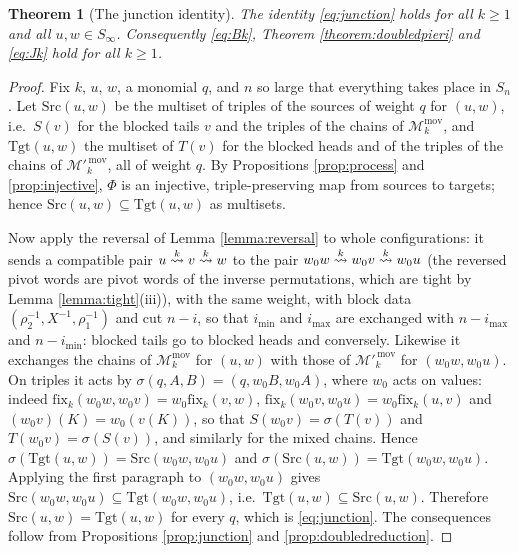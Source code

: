 \documentclass{amsart}
\newtheorem{theorem}[lemma]{Theorem}
\theoremstyle{definition}
\theoremstyle{remark}
\numberwithin{equation}{section}
\newcommand{\xrightsquigarrow}[2][]{%
	\mathrel{\mathop{\rightsquigarrow}\limits^{\scriptstyle #2}%
	\ifx\hfuzz#1\hfuzz\else_{\scriptstyle #1}\fi}%
}
\newcommand{\tom}[1]{\ensuremath{\xrightsquigarrow{#1}}}
\newcommand{\fx}{\mathrm{fix}}
\begin{document}
\begin{theorem}[The junction identity] \label{theorem:junction}
The identity \eqref{eq:junction} holds for all $k\geq1$ and all $u,w\in S_\infty$. Consequently \eqref{eq:Bk}, Theorem \ref{theorem:doubledpieri} and \eqref{eq:Jk} hold for all $k\geq1$.
\end{theorem}
\begin{proof}
Fix $k$, $u$, $w$, a monomial $q$, and $n$ so large that everything takes place in $S_n$. Let $\mathrm{Src}(u,w)$ be the multiset of triples of the sources of weight $q$ for $(u,w)$, i.e.\ $S(v)$ for the blocked tails $v$ and the triples of the chains of $\mathcal M_k^{\mathrm{mov}}$, and $\mathrm{Tgt}(u,w)$ the multiset of $T(v)$ for the blocked heads and of the triples of the chains of $\mathcal M'^{\,\mathrm{mov}}_k$, all of weight $q$. By Propositions \ref{prop:process} and \ref{prop:injective}, $\Phi$ is an injective, triple-preserving map from sources to targets; hence $\mathrm{Src}(u,w)\subseteq\mathrm{Tgt}(u,w)$ as multisets.

Now apply the reversal of Lemma \ref{lemma:reversal} to whole configurations: it sends a compatible pair $u\tom{k}v\tom{k}w$ to the pair $w_0w\tom{k}w_0v\tom{k}w_0u$ (the reversed pivot words are pivot words of the inverse permutations, which are tight by Lemma \ref{lemma:tight}(iii)), with the same weight, with block data $(\rho_2^{-1},X^{-1},\rho_1^{-1})$ and cut $n-i$, so that $i_{\min}$ and $i_{\max}$ are exchanged with $n-i_{\max}$ and $n-i_{\min}$: blocked tails go to blocked heads and conversely. Likewise it exchanges the chains of $\mathcal M_k^{\mathrm{mov}}$ for $(u,w)$ with those of $\mathcal M'^{\,\mathrm{mov}}_k$ for $(w_0w,w_0u)$. On triples it acts by $\sigma(q,A,B)=(q,w_0B,w_0A)$, where $w_0$ acts on values: indeed $\fx_k(w_0w,w_0v)=w_0\fx_k(v,w)$, $\fx_k(w_0v,w_0u)=w_0\fx_k(u,v)$ and $(w_0v)(K)=w_0(v(K))$, so that $S(w_0v)=\sigma(T(v))$ and $T(w_0v)=\sigma(S(v))$, and similarly for the mixed chains. Hence $\sigma(\mathrm{Tgt}(u,w))=\mathrm{Src}(w_0w,w_0u)$ and $\sigma(\mathrm{Src}(u,w))=\mathrm{Tgt}(w_0w,w_0u)$. Applying the first paragraph to $(w_0w,w_0u)$ gives $\mathrm{Src}(w_0w,w_0u)\subseteq\mathrm{Tgt}(w_0w,w_0u)$, i.e.\ $\mathrm{Tgt}(u,w)\subseteq\mathrm{Src}(u,w)$. Therefore $\mathrm{Src}(u,w)=\mathrm{Tgt}(u,w)$ for every $q$, which is \eqref{eq:junction}. The consequences follow from Propositions \ref{prop:junction} and \ref{prop:doubledreduction}.
\end{proof}
\end{document}
